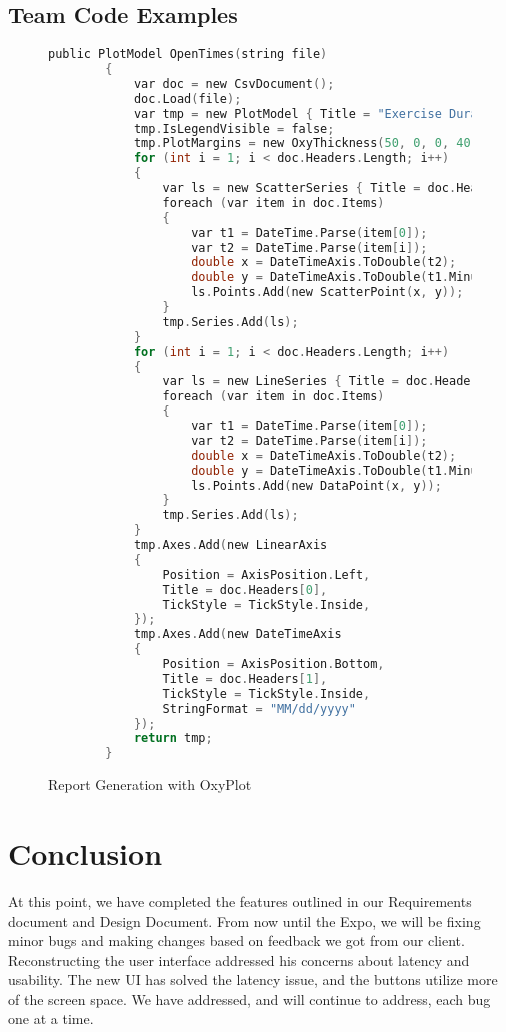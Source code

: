\documentclass[onecolumn, draftclsnofoot,10pt, compsoc]{IEEEtran}
\begin{document}
\subsection{Team Code Examples}
\begin{figure}[H]
\begin{lstlisting}[language=C, style=customc]
 public PlotModel OpenTimes(string file)
        {
            var doc = new CsvDocument();
            doc.Load(file);
            var tmp = new PlotModel { Title = "Exercise Duration Over Time" };
            tmp.IsLegendVisible = false;
            tmp.PlotMargins = new OxyThickness(50, 0, 0, 40);
            for (int i = 1; i < doc.Headers.Length; i++)
            {
                var ls = new ScatterSeries { Title = doc.Headers[i] };
                foreach (var item in doc.Items)
                {
                    var t1 = DateTime.Parse(item[0]);
                    var t2 = DateTime.Parse(item[i]);
                    double x = DateTimeAxis.ToDouble(t2);
                    double y = DateTimeAxis.ToDouble(t1.Minute);
                    ls.Points.Add(new ScatterPoint(x, y));
                }
                tmp.Series.Add(ls);
            }
            for (int i = 1; i < doc.Headers.Length; i++)
            {
                var ls = new LineSeries { Title = doc.Headers[i] };
                foreach (var item in doc.Items)
                {
                    var t1 = DateTime.Parse(item[0]);
                    var t2 = DateTime.Parse(item[i]);
                    double x = DateTimeAxis.ToDouble(t2);
                    double y = DateTimeAxis.ToDouble(t1.Minute);
                    ls.Points.Add(new DataPoint(x, y));
                }
                tmp.Series.Add(ls);
            }
            tmp.Axes.Add(new LinearAxis
            {
                Position = AxisPosition.Left,
                Title = doc.Headers[0],
                TickStyle = TickStyle.Inside,
            });
            tmp.Axes.Add(new DateTimeAxis
            {
                Position = AxisPosition.Bottom,
                Title = doc.Headers[1],
                TickStyle = TickStyle.Inside,
                StringFormat = "MM/dd/yyyy"
            });
            return tmp;
        }
\end{lstlisting}
\caption{Report Generation with OxyPlot}
\end{figure}

\section{Conclusion}
At this point, we have completed the features outlined in our Requirements document and Design Document. From now until the Expo, we will be fixing minor bugs and making changes based on feedback we got from our client. Reconstructing the user interface addressed his concerns about latency and usability. The new UI has solved the latency issue, and the buttons utilize more of the screen space. We have addressed, and will continue to address, each bug one at a time.

\newpage


\end{document}
